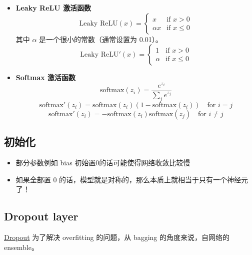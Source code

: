 \documentclass[12pt]{article}
\numberwithin{theorem}{section} %
\numberwithin{definition}{section} %
\numberwithin{assumption}{section} %
\numberwithin{lemma}{section} %
\numberwithin{remark}{section} %
\numberwithin{prop}{section} %
\numberwithin{corollary}{section} %
\numberwithin{example}{section} %
\numberwithin{question}{section} %
\numberwithin{problem}{section} %
\numberwithin{conjecture}{section} %
\numberwithin{append}{section} %
\numberwithin{property}{section} %
\begin{document}
\begin{CJK}{UTF8}{gbsn}
\begin{itemize}
\begin{itemize}
		\item \textbf{Leaky ReLU 激活函数}
		\begin{equation}
			\text{Leaky ReLU}(x) = 
			\begin{cases} 
				x & \text{if } x > 0 \\ 
				\alpha x & \text{if } x \leq 0 
			\end{cases}
		\end{equation}
		其中 $\alpha$ 是一个很小的常数（通常设置为 0.01）。
		\begin{equation}
			\text{Leaky ReLU}'(x) = 
			\begin{cases} 
				1 & \text{if } x > 0 \\ 
				\alpha & \text{if } x \leq 0 
			\end{cases}
		\end{equation}
		
		\item \textbf{Softmax 激活函数}
		\begin{equation}
			\text{softmax}(z_i) = \frac{e^{z_i}}{\sum_{j} e^{z_j}}
		\end{equation}
		\begin{equation}
			\text{softmax}'(z_i) = \text{softmax}(z_i)(1 - \text{softmax}(z_i)) \quad \text{for } i = j
		\end{equation}
		\begin{equation}
			\text{softmax}'(z_i) = -\text{softmax}(z_i)\text{softmax}(z_j) \quad \text{for } i \neq j
		\end{equation}
	\end{itemize}
\end{itemize}

\subsection{初始化}
\begin{itemize}
	\item 部分参数例如 bias 初始置0的话可能使得网络收敛比较慢
	\item 如果全部置 0 的话，模型就是对称的，那么本质上就相当于只有一个神经元了！
\end{itemize}

\subsection{Dropout layer}

\href{https://zhuanlan.zhihu.com/p/38200980}{Dropout} 
为了解决 overfitting 的问题，从 bagging 的角度来说，自网络的ensemble。



\end{CJK}
\end{document}
